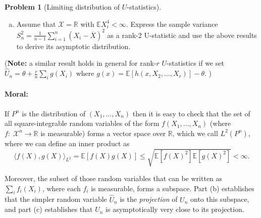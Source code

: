 \documentclass{article}
\newcommand{\cX}{\mathcal{X}}
\newcommand{\EE}{\mathbb{E}}
\newcommand{\RR}{\mathbb{R}}
\theoremstyle{definition}
\newtheorem{problem}{Problem}
\begin{document}
\begin{problem}[Limiting distribution of $U$-statistics]
\begin{enumerate}[(a)]
\item Assume that $\cX = \RR$ with $\EE X_i^4 <\infty$. Express the sample variance $S_{n}^{2} = \frac{1}{n-1}\sum_{i=1}^{n}(X_{i} - \overline{X})^{2}$ as a rank-2 U-statistic and use the above results to derive its asymptotic distribution.


\end{enumerate}

({\bf Note:} a similar result holds in general for rank-$r$ $U$-statistics if we set $\widehat{U}_n= \theta + \frac{r}{n}\sum_i g(X_i)$ where ${g(x) = \EE[h(x,X_2,\ldots,X_r)]-\theta}$. )

\paragraph{Moral:} If $P^n$ is the distribution of $(X_1,\ldots,X_n)$ then it is easy to check that the set of all square-integrable random variables of the form $f(X_1,\ldots,X_n)$ (where $f:\; \cX^n \to \RR$ is measurable) forms a vector space over $\RR$, which we call $L^2(P^n)$, where we can define an inner product as
\[
\langle f(X), g(X) \rangle_{L^2} = \EE[ f(X)g(X)] \leq \sqrt{\EE[f(X)^2] \EE[g(X)^2]} < \infty.
\]

Moreover, the subset of those random variables that can be written as $\sum_i f_i(X_i)$, where each $f_i$ is measurable, forms a subspace. Part (b) establishes that the simpler random variable $\widehat{U}_n$ is the {\em projection} of $U_n$ onto this subspace, and part (c) establishes that $U_n$ is asymptotically very close to its projection.
\end{problem}
\end{document}
